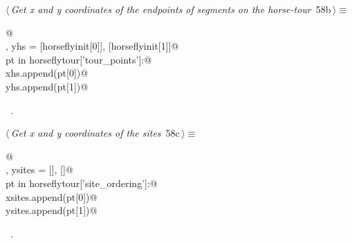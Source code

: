 \documentclass[11.5pt]{report}
\begin{document}
\vspace{-0.8cm} \newchunk
\begin{flushleft} \small
\begin{minipage}{\linewidth}\label{scrap85}\raggedright\small
{} $\langle\,${\itshape Get x and y coordinates of the endpoints of segments on the horse-tour}\nobreak\ {\footnotesize {58b}}$\,\rangle\equiv$
\vspace{-1ex}
\begin{list}{}{} \item
\mbox{}\verb@   @\\
\mbox{}\verb@xhs, yhs = [horseflyinit[0]], [horseflyinit[1]]@\\
\mbox{}\verb@for pt in horseflytour['tour_points']:@\\
\mbox{}\verb@    xhs.append(pt[0])@\\
\mbox{}\verb@    yhs.append(pt[1])@\\
\mbox{}\verb@@{\NWsep}
\end{list}
\vspace{-1.5ex}
\footnotesize
\begin{list}{}{\setlength{\itemsep}{-\parsep}\setlength{\itemindent}{-\leftmargin}}
\item \NWtxtMacroRefIn\ .

\item{}
\end{list}
\end{minipage}\vspace{4ex}
\end{flushleft}

\vspace{-0.8cm} \newchunk
\begin{flushleft} \small
\begin{minipage}{\linewidth}\label{scrap86}\raggedright\small
{} $\langle\,${\itshape Get x and y coordinates of the sites}\nobreak\ {\footnotesize {58c}}$\,\rangle\equiv$
\vspace{-1ex}
\begin{list}{}{} \item
\mbox{}\verb@   @\\
\mbox{}\verb@xsites, ysites = [], []@\\
\mbox{}\verb@for pt in horseflytour['site_ordering']:@\\
\mbox{}\verb@    xsites.append(pt[0])@\\
\mbox{}\verb@    ysites.append(pt[1])@\\
\mbox{}\verb@@{\NWsep}
\end{list}
\vspace{-1.5ex}
\footnotesize
\begin{list}{}{\setlength{\itemsep}{-\parsep}\setlength{\itemindent}{-\leftmargin}}
\item \NWtxtMacroRefIn\ .

\item{}
\end{list}
\end{minipage}\vspace{4ex}
\end{flushleft}
\end{document}
